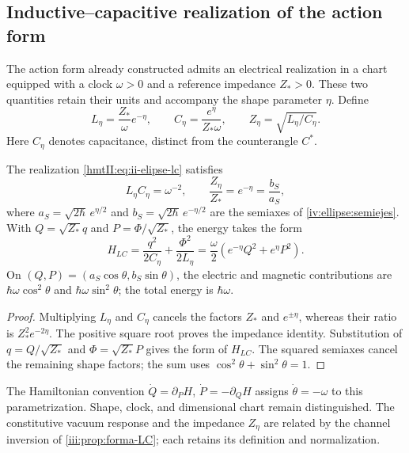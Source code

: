 \subsection{Inductive--capacitive realization of the action form}
\label{nuclear:realizacion-lc}

The action form already constructed admits an electrical realization in
a chart equipped with a clock \(\omega>0\) and a reference
impedance \(Z_*>0\). These two quantities retain their units and
accompany the shape parameter \(\eta\). Define
\begin{equation}
 L_\eta=\frac{Z_*}{\omega}e^{-\eta},\qquad
 C_\eta=\frac{e^\eta}{Z_*\omega},\qquad
 Z_\eta=\sqrt{L_\eta/C_\eta}.
 \label{hmtII:eq:ii-elipse-lc}
\end{equation}
Here \(C_\eta\) denotes capacitance, distinct from the counterangle \(C^*\).

\begin{proposition}
\label{nuclear:lc-producto}
The realization \eqref{hmtII:eq:ii-elipse-lc} satisfies
\begin{equation}
 L_\eta C_\eta=\omega^{-2},\qquad
 \frac{Z_\eta}{Z_*}=e^{-\eta}=\frac{b_S}{a_S},
 \label{hmtII:eq:ii-elipse-impedancia}
\end{equation}
where \(a_S=\sqrt{2\hbar}\,e^{\eta/2}\) and
\(b_S=\sqrt{2\hbar}\,e^{-\eta/2}\) are the semiaxes of
\cref{iv:ellipse:semiejes}.
With \(Q=\sqrt{Z_*}q\) and \(P=\Phi/\sqrt{Z_*}\), the energy takes the form
\[
 H_{LC}=\frac{q^2}{2C_\eta}+\frac{\Phi^2}{2L_\eta}
       =\frac\omega2(e^{-\eta}Q^2+e^\eta P^2).
\]
On \((Q,P)=(a_S\cos\theta,b_S\sin\theta)\), the electric
and magnetic contributions are \(\hbar\omega\cos^2\theta\) and
\(\hbar\omega\sin^2\theta\); the total energy is \(\hbar\omega\).
\end{proposition}
\begin{proof}
Multiplying \(L_\eta\) and \(C_\eta\) cancels the factors
\(Z_*\) and \(e^{\pm\eta}\), whereas their ratio is
\(Z_*^2e^{-2\eta}\). The positive square root proves the impedance identity.
Substitution of \(q=Q/\sqrt{Z_*}\) and \(\Phi=\sqrt{Z_*}P\) gives the form
of \(H_{LC}\). The squared semiaxes cancel the remaining shape
factors; the sum uses \(\cos^2\theta+\sin^2\theta=1\).
\end{proof}

The Hamiltonian convention
\(\dot Q=\partial_PH\), \(\dot P=-\partial_QH\) assigns
\(\dot\theta=-\omega\) to this parametrization. Shape, clock,
and dimensional chart remain distinguished. The constitutive
vacuum response and the impedance \(Z_\eta\) are related
by the channel inversion of \cref{iii:prop:forma-LC}; each
retains its definition and normalization.
